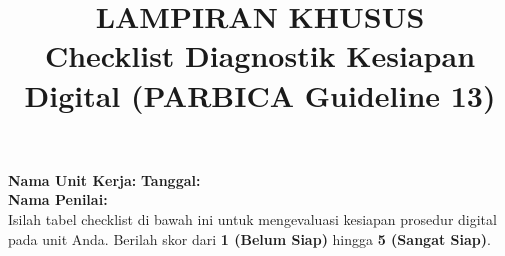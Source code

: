 \documentclass[12pt,a4paper]{report}
\title{\Large \textbf{LAMPIRAN KHUSUS} \\ \Large \textbf{Checklist Diagnostik Kesiapan Digital (PARBICA Guideline 13)}}
\date{}
\begin{document}
\maketitle
\thispagestyle{empty}

\textbf{Nama Unit Kerja:} \underline{\hspace{8cm}} \quad \textbf{Tanggal:} \underline{\hspace{4cm}}\\[0.2cm]
\textbf{Nama Penilai:} \underline{\hspace{8cm}}\\[0.5cm]

Isilah tabel checklist di bawah ini untuk mengevaluasi kesiapan prosedur digital pada unit Anda. Berilah skor dari \textbf{1 (Belum Siap)} hingga \textbf{5 (Sangat Siap)}.

\renewcommand{\arraystretch}{1.5}
\noindent
\end{document}
